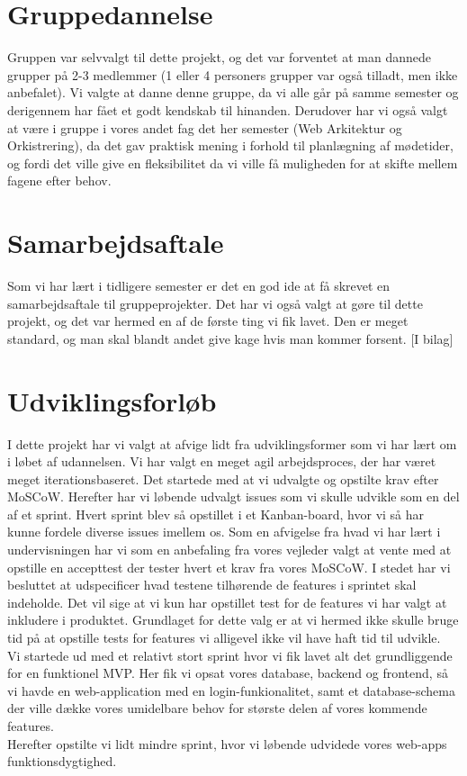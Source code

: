 \documentclass{article}
\begin{document}
\tableofcontents


\section{Gruppedannelse}
Gruppen var selvvalgt til dette projekt, og det var forventet at man dannede grupper på 2-3 medlemmer (1 eller 4 personers grupper var også tilladt, men ikke anbefalet).
Vi valgte at danne denne gruppe, da vi alle går på samme semester og derigennem har fået et godt kendskab til hinanden. 
Derudover har vi også valgt at være i gruppe i vores andet fag det her semester (Web Arkitektur og Orkistrering), da det gav praktisk mening i forhold til planlægning af mødetider, og fordi det ville give en fleksibilitet da vi ville få muligheden for at skifte mellem fagene efter behov.


\section{Samarbejdsaftale}
Som vi har lært i tidligere semester er det en god ide at få skrevet en samarbejdsaftale til gruppeprojekter. 
Det har vi også valgt at gøre til dette projekt, og det var hermed en af de første ting vi fik lavet.
Den er meget standard, og man skal blandt andet give kage hvis man kommer forsent. [I bilag]


\section{Udviklingsforløb}
I dette projekt har vi valgt at afvige lidt fra udviklingsformer som vi har lært om i løbet af udannelsen.
Vi har valgt en meget agil arbejdsproces, der har været meget iterationsbaseret.
Det startede med at vi udvalgte og opstilte krav efter MoSCoW.
Herefter har vi løbende udvalgt issues som vi skulle udvikle som en del af et sprint.
Hvert sprint blev så opstillet i et Kanban-board, hvor vi så har kunne fordele diverse issues imellem os.
Som en afvigelse fra hvad vi har lært i undervisningen har vi som en anbefaling fra vores vejleder valgt at vente med at opstille en accepttest der tester hvert et krav fra vores MoSCoW.
I stedet har vi besluttet at udspecificer hvad testene tilhørende de features i sprintet skal indeholde.
Det vil sige at vi kun har opstillet test for de features vi har valgt at inkludere i produktet.
Grundlaget for dette valg er at vi hermed ikke skulle bruge tid på at opstille tests for features vi alligevel ikke vil have haft tid til udvikle.
\\
Vi startede ud med et relativt stort sprint hvor vi fik lavet alt det grundliggende for en funktionel MVP.
Her fik vi opsat vores database, backend og frontend, så vi havde en web-application med en login-funkionalitet, samt et database-schema der ville dække vores umidelbare behov for største delen af vores kommende features.
\\ 
Herefter opstilte vi lidt mindre sprint, hvor vi løbende udvidede vores web-apps funktionsdygtighed. 
\end{document}
